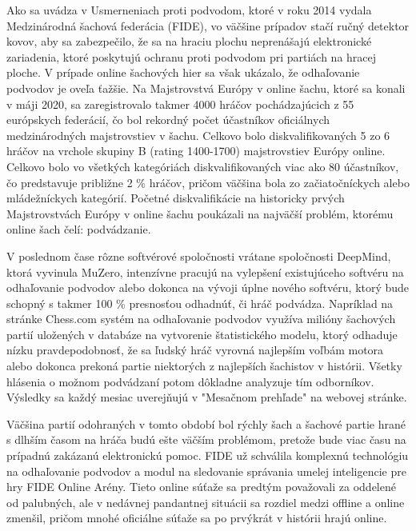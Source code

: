 \documentclass[10pt,oneside,slovak,a4paper]{article}
\begin{document}
Ako sa uvádza v Usmerneniach proti podvodom, ktoré v roku 2014 vydala Medzinárodná šachová federácia (FIDE), vo väčšine prípadov stačí ručný detektor kovov, aby sa zabezpečilo, že sa na hraciu plochu neprenášajú elektronické zariadenia, ktoré poskytujú ochranu proti podvodom pri partiách na hracej ploche. V prípade online šachových hier sa však ukázalo, že odhaľovanie podvodov je oveľa ťažšie. Na Majstrovstvá Európy v online šachu, ktoré sa konali v máji 2020, sa zaregistrovalo takmer 4000 hráčov pochádzajúcich z 55 európskych federácií, čo bol rekordný počet účastníkov oficiálnych medzinárodných majstrovstiev v šachu. Celkovo bolo diskvalifikovaných 5 zo 6 hráčov na vrchole skupiny B (rating 1400-1700) majstrovstiev Európy online. Celkovo bolo vo všetkých kategóriách diskvalifikovaných viac ako 80 účastníkov, čo predstavuje približne 2 \% hráčov, pričom väčšina bola zo začiatočníckych alebo mládežníckych kategórií. Početné diskvalifikácie na historicky prvých Majstrovstvách Európy v online šachu poukázali na najväčší problém, ktorému online šach čelí: podvádzanie.

V poslednom čase rôzne softvérové spoločnosti vrátane spoločnosti DeepMind, ktorá vyvinula MuZero, intenzívne pracujú na vylepšení existujúceho softvéru na odhaľovanie podvodov alebo dokonca na vývoji úplne nového softvéru, ktorý bude schopný s takmer 100 \% presnosťou odhadnúť, či hráč podvádza. Napríklad na stránke Chess.com systém na odhaľovanie podvodov využíva milióny šachových partií uložených v databáze na vytvorenie štatistického modelu, ktorý odhaduje nízku pravdepodobnosť, že sa ľudský hráč vyrovná najlepším voľbám motora alebo dokonca prekoná partie niektorých z najlepších šachistov v histórii. Všetky hlásenia o možnom podvádzaní potom dôkladne analyzuje tím odborníkov. Výsledky sa každý mesiac uverejňujú v "Mesačnom prehľade" na webovej stránke.

Väčšina partií odohraných v tomto období bol rýchly šach a šachové partie hrané s dlhším časom na hráča budú ešte väčším problémom, pretože bude viac času na prípadnú zakázanú elektronickú pomoc. FIDE už schválila komplexnú technológiu na odhaľovanie podvodov a modul na sledovanie správania umelej inteligencie pre hry FIDE Online Arény. Tieto online súťaže sa predtým považovali za oddelené od palubných, ale v nedávnej pandantnej situácii sa rozdiel medzi offline a online zmenšil, pričom mnohé oficiálne súťaže sa po prvýkrát v histórii hrajú online.
\end{document}
